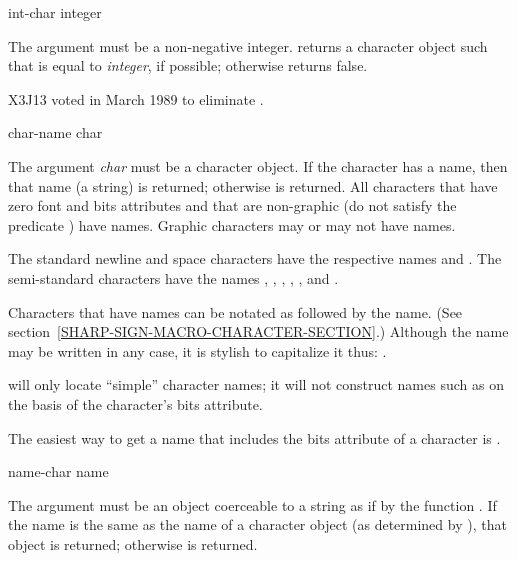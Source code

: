 \begin{obsolete}
\begin{defun}[Function]
int-char integer

The argument must be a non-negative integer.
 returns a character object  such that
 is equal to {\it integer}, if possible; otherwise
 returns false.
\end{defun}
\end{obsolete}

\begin{newer}
X3J13 voted in March 1989 
to eliminate .
\end{newer}

\begin{defun}[Function]
char-name char

The argument {\it char} must be a character object.
If the character has a name, then that name (a string) is returned;
otherwise {\false} is returned.  All characters that have
zero font and bits attributes and that are non-graphic
(do not satisfy the predicate ) have names.
Graphic characters may or may not have names.

The standard newline and space characters have the respective
names  and .
The semi-standard characters have the names
, , , , , and .


Characters that have names can be notated as \cd{\#{\Xbackslash}} followed
by the name.  (See section~\ref{SHARP-SIGN-MACRO-CHARACTER-SECTION}.)
Although the name may be written in any case,
it is stylish to capitalize it thus: .

 will only locate ``simple'' character names;
it will not construct names such as  on the
basis of the character's bits attribute.

\begin{new}
The easiest way to get a name that includes the bits attribute of
a character  is .
\end{new}
\end{defun}

\begin{defun}[Function]
name-char name

The argument  must be an object coerceable to a string
as if by the function .
If the name is the same as the name of a character object
(as determined by ), that object
is returned; otherwise {\false} is returned.
\end{defun}

